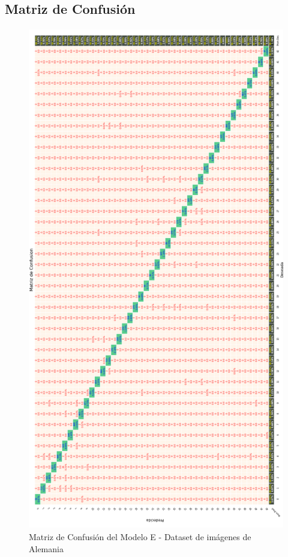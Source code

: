 	 	\subsection{Matriz de Confusión}  
			\begin{figure}[H]
				\begin{center}
				\includegraphics[width=1\textwidth, height=22cm]{images/desarrollo/testResults/german/model_A_A} 
				\end{center}
				\begin{center}
				\caption{\small{Matriz de Confusión del Modelo E - Dataset de imágenes de Alemania}}
				{\small{\fontsize{10}{16.8}\selectfont {Fuente propia}}}
				\end{center}
				\vspace{-1.5em}
			\end{figure}
